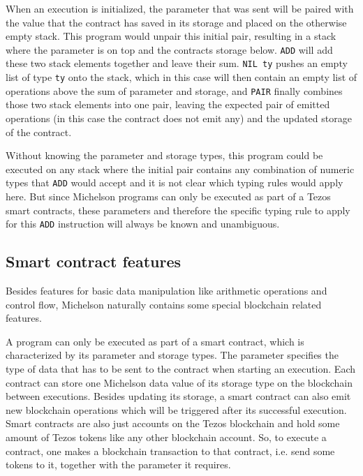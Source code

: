 
When an execution is initialized, the parameter that was sent will be paired with the
value that the contract has saved in its storage and placed on the otherwise empty stack.
This program would unpair this initial pair, resulting in a stack where the parameter is
on top and the contracts storage below. \verb/ADD/ will add these two stack elements together
and leave their sum. \verb/NIL ty/ pushes an empty list of type \verb/ty/ onto the stack,
which in this case will then contain an empty list of operations
above the sum of parameter and storage,
and \verb/PAIR/ finally combines those two stack elements into one pair, leaving the expected
pair of emitted operations (in this case the contract does not emit any) and the updated
storage of the contract.

Without knowing the parameter and storage types, this program could be executed on any stack
where the initial pair contains any combination of numeric types that \verb/ADD/ would accept
and it is not clear which typing rules would apply here.
But since Michelson programs can only be executed as part of a Tezos smart contracts,
these parameters and therefore the specific typing rule to apply for this \verb/ADD/ instruction
will always be known and unambiguous.


\subsection{Smart contract features}\label{sec:smart}

Besides features for basic data manipulation like arithmetic operations and control flow,
Michelson naturally contains some special blockchain related features.

A program can only be executed as part of a smart contract,
which is characterized by its parameter and storage types.
The parameter specifies the type of data that has to be sent to the contract when starting
an execution.
Each contract can store one Michelson data value of its storage type
on the blockchain between executions.
Besides updating its storage, a smart contract can also emit new blockchain operations
which will be triggered after its successful execution.
Smart contracts are also just accounts on the Tezos blockchain and hold some amount of Tezos tokens
like any other blockchain account.
So, to execute a contract, one makes a blockchain transaction to that contract,
i.e. send some tokens to it, together with the parameter it requires.

